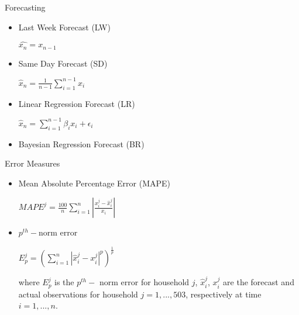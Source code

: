 \documentclass{beamer}
\begin{document}
\begin{frame}{Forecasting}
\begin{itemize}
\item Last Week Forecast (LW)

\begin{center} $\hat{x_n} = x_{n-1}$ \end{center}

\item Same Day Forecast (SD)

\begin{center} $\hat{x}_n = \frac{1}{n-1} \displaystyle \sum_{i=1}^{n-1} x_i$ \end{center}

\item Linear Regression Forecast (LR)

\begin{center} $\hat{x}_n = \displaystyle \sum_{i=1}^{n-1} \beta_i x_i + \epsilon_i$ \end{center}

\item Bayesian Regression Forecast (BR)
\end{itemize}
\end{frame}

\begin{frame}{Error Measures}
\begin{itemize}
\item Mean Absolute Percentage Error (MAPE)

\begin{center} $MAPE^j = \frac{100}{n} \displaystyle \sum_{i=1}^n \left|\frac{x^j_i - \hat{x}^j_i}{x_i}\right|$ \end{center}

\item $p^{th}-$norm error

\begin{center} $E_p^j = \left(\displaystyle \sum_{i=1}^n |\hat{x}^j_i - x^j_i|^p\right)^{\frac{1}{p}}$ \end{center}

where $E_p^j$ is the $p^{th}-$ norm error for household $j$, $\hat{x}^j_i$, $x^j_i$ are the forecast and actual observations for household $j=1, ... , 503$, respectively at time $i = 1, ... , n$.

\end{itemize}
\end{frame}
\end{document}
